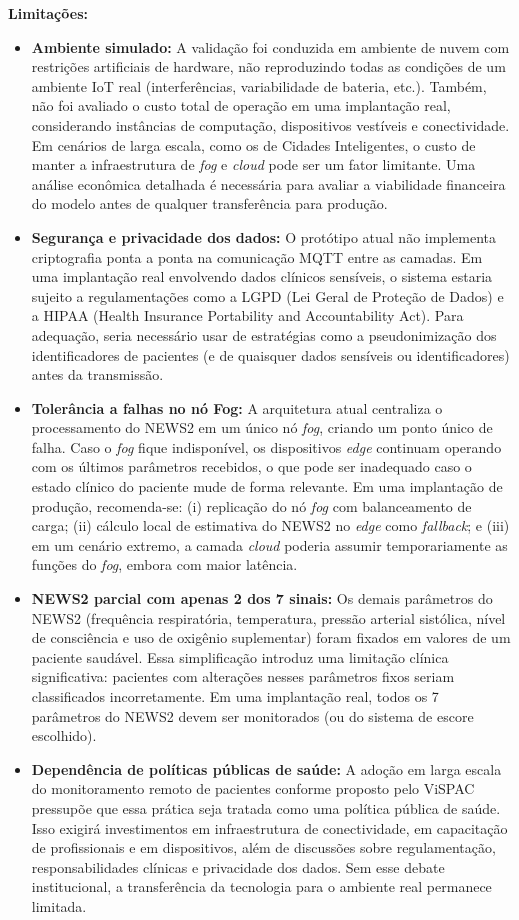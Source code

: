 \documentclass[twoside,english,brazilian]{UNISINOSmonografia}
\begin{document}
\textbf{Limitações:}
\begin{itemize}
\item \textbf{Ambiente simulado:} A validação foi conduzida em ambiente de nuvem com restrições artificiais de hardware, não reproduzindo todas as condições de um ambiente IoT real (interferências, variabilidade de bateria, etc.). Também, não foi avaliado o custo total de operação em uma implantação real, considerando instâncias de computação, dispositivos vestíveis e conectividade. Em cenários de larga escala, como os de Cidades Inteligentes, o custo de manter a infraestrutura de \textit{fog} e \textit{cloud} pode ser um fator limitante. Uma análise econômica detalhada é necessária para avaliar a viabilidade financeira do modelo antes de qualquer transferência para produção.
\item \textbf{Segurança e privacidade dos dados:} O protótipo atual não implementa criptografia ponta a ponta na comunicação MQTT entre as camadas. Em uma implantação real envolvendo dados clínicos sensíveis, o sistema estaria sujeito a regulamentações como a LGPD (Lei Geral de Proteção de Dados) e a HIPAA (Health Insurance Portability and Accountability Act). Para adequação, seria necessário usar de estratégias como a pseudonimização dos identificadores de pacientes (e de quaisquer dados sensíveis ou identificadores) antes da transmissão.
\item \textbf{Tolerância a falhas no nó Fog:} A arquitetura atual centraliza o processamento do NEWS2 em um único nó \textit{fog}, criando um ponto único de falha. Caso o \textit{fog} fique indisponível, os dispositivos \textit{edge} continuam operando com os últimos parâmetros recebidos, o que pode ser inadequado caso o estado clínico do paciente mude de forma relevante. Em uma implantação de produção, recomenda-se: (i) replicação do nó \textit{fog} com balanceamento de carga; (ii) cálculo local de estimativa do NEWS2 no \textit{edge} como \textit{fallback}; e (iii) em um cenário extremo, a camada \textit{cloud} poderia assumir temporariamente as funções do \textit{fog}, embora com maior latência.
\item \textbf{NEWS2 parcial com apenas 2 dos 7 sinais:} Os demais parâmetros do NEWS2 (frequência respiratória, temperatura, pressão arterial sistólica, nível de consciência e uso de oxigênio suplementar) foram fixados em valores de um paciente saudável. Essa simplificação introduz uma limitação clínica significativa: pacientes com alterações nesses parâmetros fixos seriam classificados incorretamente. Em uma implantação real, todos os 7 parâmetros do NEWS2 devem ser monitorados (ou do sistema de escore escolhido).
\item \textbf{Dependência de políticas públicas de saúde:} A adoção em larga escala do monitoramento remoto de pacientes conforme proposto pelo ViSPAC pressupõe que essa prática seja tratada como uma política pública de saúde. Isso exigirá investimentos em infraestrutura de conectividade, em capacitação de profissionais e em dispositivos, além de discussões sobre regulamentação, responsabilidades clínicas e privacidade dos dados. Sem esse debate institucional, a transferência da tecnologia para o ambiente real permanece limitada.
\end{itemize}
\end{document}

